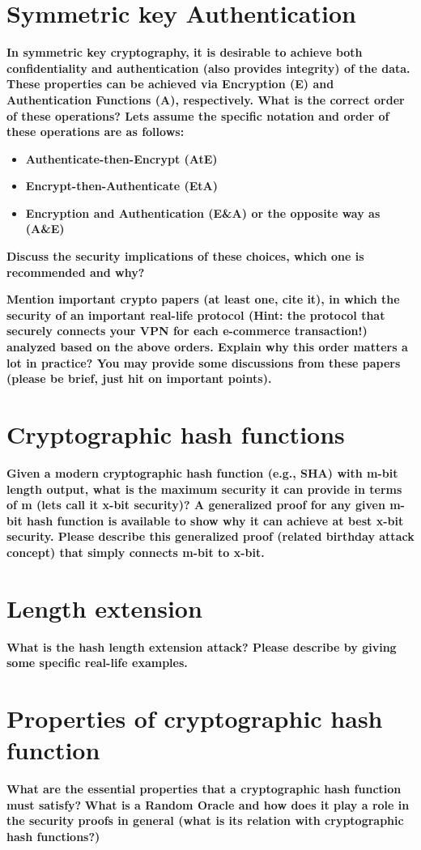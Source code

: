 \documentclass[letterpaper,11pt,notitlepage,fleqn]{article}
\begin{document}
\section{Symmetric key Authentication}
\noindent \textbf{In  symmetric  key  cryptography,  it  is  desirable  to  achieve  both  confidentiality  and authentication  (also  provides  integrity)  of  the  data.  These  properties  can  be  achieved  via Encryption (E) and Authentication Functions (A), respectively. What is the correct order of these operations? Lets assume the specific notation and order of these operations are as follows:} 
\begin{itemize}
    \item \textbf{Authenticate-then-Encrypt (AtE)}
    \item \textbf{Encrypt-then-Authenticate (EtA)}
    \item \textbf{Encryption and Authentication (E\&A) or the opposite way as (A\&E)}
\end{itemize}

\noindent \textbf{Discuss the security implications of these choices, which one is recommended and why?}

\noindent \textbf{Mention important crypto papers (at least one, cite it), in which the security of an important real-life  protocol  (Hint:  the  protocol  that  securely  connects  your  VPN  for  each  e-commerce transaction!)  analyzed  based  on  the  above  orders.  Explain  why  this  order  matters  a  lot  in practice?  You  may  provide  some  discussions  from  these  papers  (please  be  brief,  just  hit  on important points).}

\section{Cryptographic  hash  functions}
\noindent \textbf{Given  a modern  cryptographic  hash  function  (e.g.,  SHA) with m-bit  length  output, what is  the maximum  security  it  can  provide  in  terms  of  m  (lets  call  it  x-bit  security)? A  generalized proof  for  any  given  m-bit  hash  function  is  available  to  show  why  it  can  achieve  at  best  x-bit security.  Please  describe  this  generalized  proof  (related  birthday  attack  concept)  that  simply connects m-bit to x-bit.}

\section{Length extension}
\noindent \textbf{What  is  the  hash  length  extension  attack?  Please  describe  by  giving  some  specific  real-life examples.}

\section{Properties of cryptographic hash function}
\noindent \textbf{What are the essential properties that a cryptographic hash function must satisfy?}
\noindent \textbf{What is a Random Oracle and how does it play a role in the security proofs in general 
(what is its relation with cryptographic hash functions?)}

\medskip
 


\end{document}
